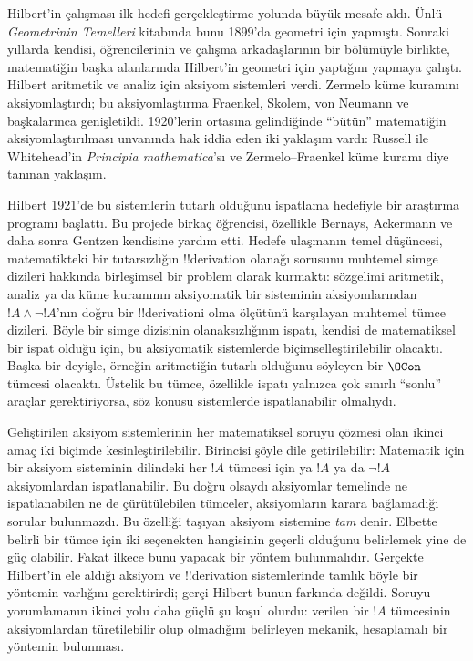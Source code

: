 \documentclass[../../../include/open-logic-section]{subfiles}
\begin{document}
Hilbert'in çalışması ilk hedefi gerçekleştirme yolunda büyük mesafe aldı.
Ünlü \emph{Geometrinin Temelleri} kitabında bunu 1899'da geometri için
yapmıştı. Sonraki yıllarda kendisi, öğrencilerinin ve çalışma arkadaşlarının
bir bölümüyle birlikte, matematiğin başka alanlarında Hilbert'in geometri
için yaptığını yapmaya çalıştı. Hilbert aritmetik ve analiz için aksiyom
sistemleri verdi. Zermelo küme kuramını aksiyomlaştırdı; bu aksiyomlaştırma
Fraenkel, Skolem, von Neumann ve başkalarınca genişletildi. 1920'lerin
ortasına gelindiğinde ``bütün'' matematiğin aksiyomlaştırılması unvanında hak
iddia eden iki yaklaşım vardı: Russell ile Whitehead'in \emph{Principia
mathematica}'sı ve Zermelo--Fraenkel küme kuramı diye tanınan yaklaşım.

Hilbert 1921'de bu sistemlerin tutarlı olduğunu ispatlama hedefiyle bir
araştırma programı başlattı. Bu projede birkaç öğrencisi, özellikle Bernays,
Ackermann ve daha sonra Gentzen kendisine yardım etti. Hedefe ulaşmanın
temel düşüncesi, matematikteki bir tutarsızlığın !!{derivation} olanağı
sorusunu muhtemel simge dizileri hakkında birleşimsel bir problem olarak
kurmaktı: sözgelimi aritmetik, analiz ya da küme kuramının aksiyomatik bir
sisteminin aksiyomlarından $!A \land \lnot !A$'nın doğru bir
!!{derivation}{}i olma ölçütünü karşılayan muhtemel tümce dizileri. Böyle bir
simge dizisinin olanaksızlığının ispatı, kendisi de matematiksel bir ispat
olduğu için, bu aksiyomatik sistemlerde biçimselleştirilebilir olacaktı.
Başka bir deyişle, örneğin aritmetiğin tutarlı olduğunu söyleyen bir
$\OCon$ tümcesi olacaktı. Üstelik bu tümce, özellikle ispatı yalnızca çok
sınırlı ``sonlu'' araçlar gerektiriyorsa, söz konusu sistemlerde
ispatlanabilir olmalıydı.

Geliştirilen aksiyom sistemlerinin her matematiksel soruyu çözmesi olan
ikinci amaç iki biçimde kesinleştirilebilir. Birincisi şöyle dile
getirilebilir: Matematik için bir aksiyom sisteminin dilindeki her $!A$
tümcesi için ya $!A$ ya da $\lnot !A$ aksiyomlardan ispatlanabilir. Bu doğru
olsaydı aksiyomlar temelinde ne ispatlanabilen ne de çürütülebilen tümceler,
aksiyomların karara bağlamadığı sorular bulunmazdı. Bu özelliği taşıyan
aksiyom sistemine \emph{tam} denir. Elbette belirli bir tümce için iki
seçenekten hangisinin geçerli olduğunu belirlemek yine de güç olabilir.
Fakat ilkece bunu yapacak bir yöntem bulunmalıdır. Gerçekte Hilbert'in ele
aldığı aksiyom ve !!{derivation} sistemlerinde tamlık böyle bir yöntemin
varlığını gerektirirdi; gerçi Hilbert bunun farkında değildi. Soruyu
yorumlamanın ikinci yolu daha güçlü şu koşul olurdu: verilen bir $!A$
tümcesinin aksiyomlardan türetilebilir olup olmadığını belirleyen mekanik,
hesaplamalı bir yöntemin bulunması.
\end{document}
